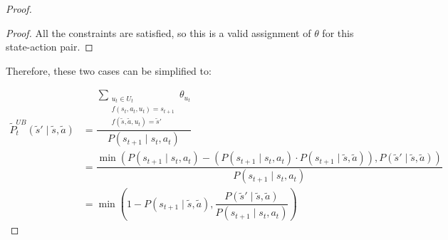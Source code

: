 \begin{proof}
\begin{proof}
All the constraints are satisfied, so this is a valid assignment of $\theta$ for this state-action pair.
\end{proof}    

Therefore, these two cases can be simplified to:

\begin{align*}
\tilde{P}_{t}^{UB}(\tilde{s}' \mid \tilde{s}, \tilde{a}) &= \dfrac{\sum_{\substack{u_t \in U_t \\f(s_t, a_t, u_t) = s_{t+1} \\ f(\tilde{s}, \tilde{a}, u_t) = \tilde{s}'}}{\theta_{u_t}}}{P(s_{t+1} \mid s_t, a_t)}\\ &=
 \dfrac{\min\left(P(s_{t+1} \mid s_t, a_t) - (P(s_{t+1} \mid s_t, a_t) \cdot P(s_{t+1} \mid \tilde{s}, \tilde{a})), P(\tilde{s}' \mid \tilde{s}, \tilde{a})\right)}{P(s_{t+1} \mid s_t, a_t)}\\
 &= \min\left(1 - P(s_{t+1} \mid \tilde{s}, \tilde{a}), \dfrac{P(\tilde{s}' \mid \tilde{s}, \tilde{a})}{P(s_{t+1} \mid s_t, a_t)}\right)
\end{align*}

\end{proof}